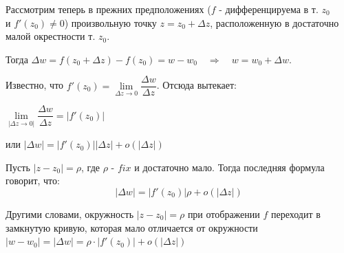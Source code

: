 \documentclass[a4paper, 12pt]{report}
\begin{document}
\begin{figure}[t]
\begin{minipage}[t]{0.32\linewidth}
\end{minipage}
\end{figure}





\par\bigskip Рассмотрим теперь в прежних предположениях ($f$ - дифференцируема в т. $z_0$\\ и $f'(z_0) \ne 0$) произвольную точку $z = z_0 +\Delta z$, расположенную в достаточно малой окрестности т. $z_0$.

Тогда $\Delta w = f(z_0 + \Delta z) - f(z_0) = w - w_0 \quad \Rightarrow \quad w = w_0 + \Delta w$.

Известно, что $f'(z_0) = \lim\limits_{\Delta z \rightarrow 0} \dfrac{\Delta w}{\Delta z}$. Отсюда вытекает:

\begin{center}
	$\lim\limits_{|\Delta z \rightarrow 0|} \dfrac{\Delta w}{\Delta z} = |f'(z_0)|$
	\bigskip

	или $|\Delta w| = |f'(z_0)||\Delta z| + o(|\Delta z|)$
\end{center}

Пусть $|z - z_0| = \rho$, где $\rho$ - $fix$ и достаточно мало. Тогда последняя формула говорит, что:
	$$|\Delta w| = |f'(z_0)|\rho + o(|\Delta z|)$$
	\par\bigskip
Другими словами, окружность $|z - z_0| = \rho$ при отображении $f$ переходит в замкнутую кривую, которая мало отличается от окружности $|w - w_0| = |\Delta w| = \rho \cdot |f'(z_0)| + o(|\Delta z|)$
\end{document}
